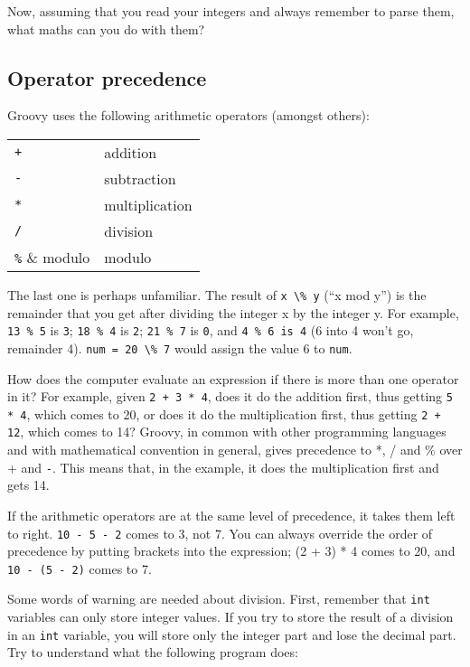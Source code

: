 Now, assuming that you read your integers and always remember to parse
them, what maths can you do with them?

\subsection{Operator precedence}
\label{sec:prec}

Groovy uses the following arithmetic operators (amongst others):

\begin{tabular}{ll}
\verb!+! & addition\\
\verb!-! & subtraction\\
\verb!*! & multiplication\\
\verb!/! & division\\
\verb!%! & modulo\\
\end{tabular}

The last one is perhaps unfamiliar.  The result of \verb!x \% y! (``x mod y'')
is the remainder that you get after dividing the integer x by the integer y.
For example, \verb!13 % 5! is \verb!3!; \verb!18 % 4! is \verb!2!; 
\verb!21 % 7! is \verb!0!, and \verb!4 % 6 is 4! (6 into 4 won't go, 
remainder 4).  \verb!num = 20 \% 7! would assign the value 6
to \verb!num!.

How does the computer evaluate an expression if there is more than one
operator in it? For example, given \verb!2 + 3 * 4!, does it do the
addition first, thus getting \verb!5 * 4!, which comes to 20, or does
it do the multiplication first, thus getting \verb!2 + 12!, which
comes to 14?  Groovy, in common with other programming languages and
with mathematical convention in general, gives precedence to *, / and
\% over + and \verb!-!.  This means that, in the example, it does the
multiplication first and gets 14.

If the arithmetic operators are at the same level of precedence, it
takes them left to right.  \verb!10 - 5 - 2! comes to 3, not 7.  You
can always override the order of precedence by putting brackets into
the expression; (2 + 3) * 4 comes to 20, and \verb!10 - (5 - 2)! comes
to 7.

Some words of warning are needed about division. First, remember that
\verb-int- variables can only store integer values. If you try to
store the result of a division in an \verb-int- variable, you will
store only the integer part and lose the decimal part. Try to
understand what the following program does:

